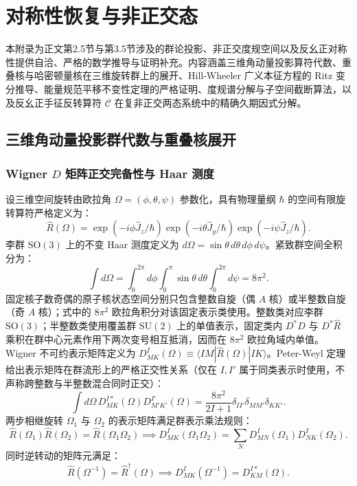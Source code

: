 \chapter{对称性恢复与非正交态}\label{app:projection}

本附录为正文第2.5节与第3.5节涉及的群论投影、非正交度规空间以及反幺正对称性提供自洽、严格的数学推导与证明补充。内容涵盖三维角动量投影算符代数、重叠核与哈密顿量核在三维旋转群上的展开、Hill-Wheeler 广义本征方程的 Ritz 变分推导、能量规范平移不变性定理的严格证明、度规谱分解与子空间截断算法，以及反幺正手征反转算符 $\mathcal{C}$ 在复非正交两态系统中的精确久期因式分解。

\section{三维角动量投影群代数与重叠核展开}\label{sec:appB-1}

\subsection{Wigner $D$ 矩阵正交完备性与 Haar 测度}

设三维空间旋转由欧拉角 $\Omega = (\phi, \theta, \psi)$ 参数化，具有物理量纲 $\hbar$ 的空间有限旋转算符严格定义为：
\begin{equation}\label{eq:appB-rot-def}
\hat{R}(\Omega) = \exp(-i \phi \hat{J}_z / \hbar) \exp(-i \theta \hat{J}_y / \hbar) \exp(-i \psi \hat{J}_z / \hbar).
\end{equation}
李群 $\mathrm{SO}(3)$ 上的不变 Haar 测度定义为 $d\Omega = \sin\theta \, d\theta \, d\phi \, d\psi$。紧致群空间全积分为：
\begin{equation}\label{eq:appB-haar-measure}
\int d\Omega = \int_0^{2\pi} d\phi \int_0^\pi \sin\theta \, d\theta \int_0^{2\pi} d\psi = 8\pi^2.
\end{equation}
固定核子数奇偶的原子核状态空间分别只包含整数自旋（偶 $A$ 核）或半整数自旋（奇 $A$ 核）；式中的 $8\pi^2$ 欧拉角积分对该固定表示类使用。整数类对应李群 $\mathrm{SO}(3)$；半整数类使用覆盖群 $\mathrm{SU}(2)$ 上的单值表示，固定类内 $D^* D$ 与 $D^* \hat{R}$ 乘积在群中心元素作用下两次变号相互抵消，因而在 $8\pi^2$ 欧拉角域内单值。Wigner 不可约表示矩阵定义为 $D^I_{MK}(\Omega) \equiv \langle IM | \hat{R}(\Omega) | IK \rangle$。Peter-Weyl 定理给出表示矩阵在群流形上的严格正交性关系（仅在 $I, I'$ 属于同类表示时使用，不声称跨整数与半整数混合同时正交）：
\begin{equation}\label{eq:appB-D-orthonormality}
\int d\Omega \, D^{I*}_{MK}(\Omega) D^{I'}_{M'K'}(\Omega) = \frac{8\pi^2}{2I+1} \delta_{II'} \delta_{MM'} \delta_{KK'}.
\end{equation}
两步相继旋转 $\Omega_1$ 与 $\Omega_2$ 的表示矩阵满足群表示乘法规则：
\begin{equation}\label{eq:appB-D-multiplication}
\hat{R}(\Omega_1) \hat{R}(\Omega_2) = \hat{R}(\Omega_1 \Omega_2) \implies D^I_{MK}(\Omega_1 \Omega_2) = \sum_N D^I_{MN}(\Omega_1) D^I_{NK}(\Omega_2).
\end{equation}
同时逆转动的矩阵元满足：
\begin{equation}\label{eq:appB-D-inverse}
\hat{R}(\Omega^{-1}) = \hat{R}^\dagger(\Omega) \implies D^I_{MK}(\Omega^{-1}) = D^{I*}_{KM}(\Omega).
\end{equation}

